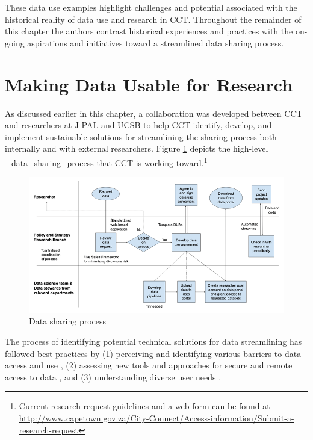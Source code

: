 \documentclass[
]{book}
\begin{document}
These data use examples highlight challenges and potential associated with the historical reality of data use and research in CCT. Throughout the remainder of this chapter the authors contrast historical experiences and practices with the on-going aspirations and initiatives toward a streamlined data sharing process.

\hypertarget{making-data-usable-for-research-5}{%
\section{Making Data Usable for Research}\label{making-data-usable-for-research-5}}

As discussed earlier in this chapter, a collaboration was developed between CCT and researchers at J-PAL and UCSB to help CCT identify, develop, and implement sustainable solutions for streamlining the sharing process both internally and with external researchers. Figure \ref{fig:cctfigure1} depicts the high-level +data\_sharing\_process\textbar{} that CCT is working toward.\footnote{Current research request guidelines and a web form can be found at \url{http://www.capetown.gov.za/City-Connect/Access-information/Submit-a-research-request}}

\begin{figure}
\includegraphics[width=1\linewidth]{./assets/cct/cctfigure1web} \caption{Data sharing process}\label{fig:cctfigure1}
\end{figure}

The process of identifying potential technical solutions for data streamlining has followed best practices by (1) perceiving and identifying various barriers to data access and use \citep{connelly2016, goerge2018, lane2008, petrila2018, abraham2019}, (2) assessing new tools and approaches for secure and remote access to data \citep{lane2008, culhane2018, foster2018}, and (3) understanding diverse user needs \citep{lane2018, abraham2019}.
\end{document}
